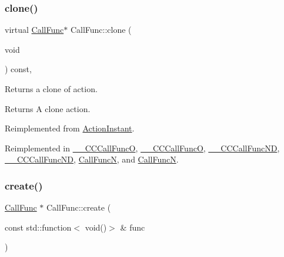 \mbox{\label{classCallFunc_a29d4c56d05c63d066a99601c7f9e32cc}} 
\subsubsection{\texorpdfstring{clone()}{clone()}\hspace{0.1cm}{\footnotesize\ttfamily [2/2]}}
{\footnotesize\ttfamily virtual \hyperlink{classCallFunc}{Call\+Func}$\ast$ Call\+Func\+::clone (\begin{DoxyParamCaption}\item[{void}]{ }\end{DoxyParamCaption}) const\hspace{0.3cm}{\ttfamily [override]}, {\ttfamily [virtual]}}

Returns a clone of action.

\begin{DoxyReturn}{Returns}
A clone action. 
\end{DoxyReturn}


Reimplemented from \hyperlink{classActionInstant_adb76fc6f006098109e8256210cbd8cc0}{Action\+Instant}.



Reimplemented in \hyperlink{class____CCCallFuncO_a83119c4b99a7f866556d0e2945ebd61b}{\+\_\+\+\_\+\+C\+C\+Call\+FuncO}, \hyperlink{class____CCCallFuncO_ae01d43dd90e3052c278e1431097c2b2e}{\+\_\+\+\_\+\+C\+C\+Call\+FuncO}, \hyperlink{class____CCCallFuncND_a1c4550d2841e8c7469f2831bedfa2726}{\+\_\+\+\_\+\+C\+C\+Call\+Func\+ND}, \hyperlink{class____CCCallFuncND_a0b1d35734a49b6c12144e4b025fe84eb}{\+\_\+\+\_\+\+C\+C\+Call\+Func\+ND}, \hyperlink{classCallFuncN_aad41687c463cb5d6e9a5879b0dd8b1e3}{Call\+FuncN}, and \hyperlink{classCallFuncN_a0284c35f23aa8b68bc921eb044b6dd54}{Call\+FuncN}.

\mbox{\label{classCallFunc_a810abdb71d71e69c7dfa7c0704152878}} 
\subsubsection{\texorpdfstring{create()}{create()}\hspace{0.1cm}{\footnotesize\ttfamily [1/4]}}
{\footnotesize\ttfamily \hyperlink{classCallFunc}{Call\+Func} $\ast$ Call\+Func\+::create (\begin{DoxyParamCaption}\item[{const std\+::function$<$ void()$>$ \&}]{func }\end{DoxyParamCaption})\hspace{0.3cm}{\ttfamily [static]}}

